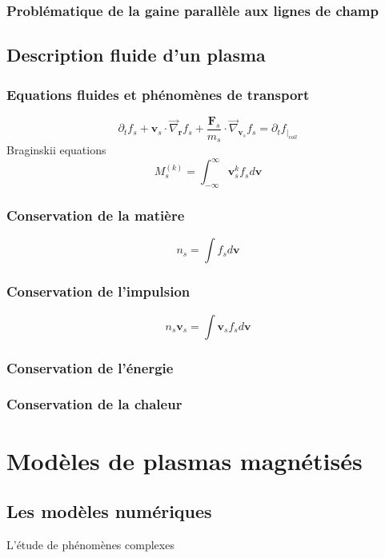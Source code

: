 \subsubsection{Problématique de la gaine parallèle aux lignes de champ}
\subsection{Description fluide d'un plasma}

\subsubsection{Equations fluides et phénomènes de transport}
\label{Maxwell-Boltzmann}
$$\partial_tf_s+\mathbf{v}_s\cdot\vec\nabla_\mathbf{r}f_s+
\frac{\mathbf{F}_s}{m_s}\cdot\vec\nabla_{\mathbf{v}_s}f_s
=\partial_tf_{|_{coll}}$$ 
Braginskii equations
$$M^{(k)}_s=\int_{-\infty}^{\infty}\mathbf{v}_s^kf_sd\mathbf{v}$$
\subsubsection{Conservation de la matière}
$$n_s=\int f_sd\mathbf{v}$$

\subsubsection{Conservation de l'impulsion}
$$n_s\mathbf{v}_s=\int \mathbf{v}_sf_sd\mathbf{v}$$
\subsubsection{Conservation de l'énergie}
\subsubsection{Conservation de la chaleur}


\section{Modèles de plasmas magnétisés}
\subsection{Les modèles numériques}
L'étude de phénomènes complexes
%

